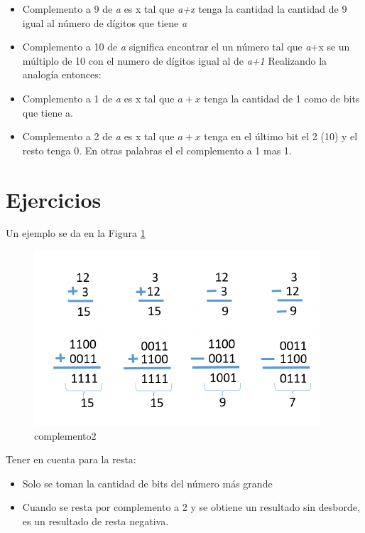 \documentclass[12pt,letterpaper]{book}
\begin{document}
\begin{itemize}
\item Complemento a 9 de \textit{a} es x tal que \textit{a+x} tenga la cantidad la cantidad de 9 igual al número de dígitos que tiene \textit{a}
\item Complemento a 10 de \textit{a} significa encontrar el un número tal que \textit{a}+x se un múltiplo de 10 con el numero de dígitos igual al de \textit{a+1} 
Realizando la analogía entonces:
\item Complemento a 1 de \textit{a} es x tal que $a+x$ tenga la cantidad de 1 como de bits que tiene a.
\item Complemento a 2 de \textit{a} es x tal que $a+x$ tenga en el último bit el 2 (10) y el resto tenga 0. En otras palabras el el complemento a 1 mas 1.
\end{itemize}  
  
   \section{Ejercicios}
   

  Un ejemplo se da en la Figura \ref{complemento2} 
  
  \begin{figure}[H]
  \centering
  \includegraphics[width=1\linewidth]{figures/complemento2.png}
  \caption{complemento2}
  \label{complemento2}
  \end{figure}
  \vspace{0.2cm}
   
Tener en cuenta para la resta:

\begin{itemize}
\item Solo se toman la cantidad de bits del número más grande
\item Cuando se resta por complemento a 2 y se obtiene un resultado sin desborde, es un resultado de resta negativa.
\end{itemize} 
 
\end{document}
